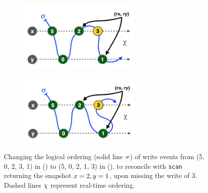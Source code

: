 \begin{figure}[t]
\begin{subfigure}[t]{0.49\textwidth}
\includegraphics[width=6.1cm]{res/relink-before3.pdf}
\caption{\label{fig:reorder:before}} %
\end{subfigure} \hfill
\begin{subfigure}[t]{0.49\textwidth}
\includegraphics[width=6.1cm]{res/relink-after3.pdf}
\caption{\label{fig:reorder:after}} %
\end{subfigure}%
%
\caption{\label{fig:reorder} Changing the logical ordering (solid line
  $\sigma$) of write events from (5, 0, 2, 3, 1) in
  () to (5, 0, 2, 1, 3) in
  (), to reconcile with {\tt scan} returning
  the snapshot $x=2, y=1$, upon missing the write of $3$. Dashed
  lines $\chi$ represent real-time ordering.}
\end{figure}

